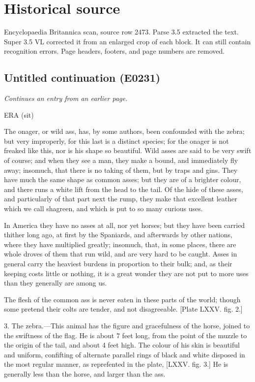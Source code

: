 \documentclass{article}
\begin{document}
\section*{Historical source}
Encyclopaedia Britannica scan, source row 2473. Parse 3.5 extracted the text. Super 3.5 VL corrected it from an enlarged crop of each block. It can still contain recognition errors.
Page headers, footers, and page numbers are removed.

\subsection*{Untitled continuation (E0231)}
\textit{Continues an entry from an earlier page.}

ERA (sit)

The onager, or wild ass, has, by some authors, been confounded with the zebra; but very improperly, for this last is a distinct species; for the onager is not freaked like this, nor is his shape so beautiful. Wild asses are said to be very swift of course; and when they see a man, they make a bound, and immediately fly away; insomuch, that there is no taking of them, but by traps and gins. They have much the same shape as common asses; but they are of a brighter colour, and there runs a white lift from the head to the tail. Of the hide of these asses, and particularly of that part next the rump, they make that excellent leather which we call shagreen, and which is put to so many curious uses.

In America they have no asses at all, nor yet horses; but they have been carried thither long ago, at first by the Spaniards, and afterwards by other nations, where they have multiplied greatly; insomuch, that, in some places, there are whole droves of them that run wild, and are very hard to be caught. Asses in general carry the heaviest burdens in proportion to their bulk; and, as their keeping costs little or nothing, it is a great wonder they are not put to more uses than they generally are among us.

The flesh of the common ass is never eaten in these parts of the world; though some pretend their colts are tender, and not disagreeable. [Plate LXXV. fig. 2.]

3. The zebra.—This animal has the figure and gracefulness of the horse, joined to the swiftness of the flag. He is about 7 feet long, from the point of the muzzle to the origin of the tail, and about 4 feet high. The colour of his skin is beautiful and uniform, confifting of alternate parallel rings of black and white disposed in the most regular manner, as reprefented in the plate, [LXXV. fig. 3.] He is generally less than the horse, and larger than the ass.
\end{document}
